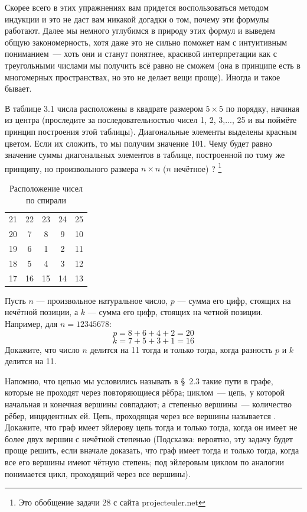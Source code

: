 Скорее всего в этих упражнениях вам придется воспользоваться методом индукции и это не даст вам никакой догадки о том, почему эти формулы работают. Далее мы немного углубимся в природу этих формул и выведем общую закономерность, хотя даже это не сильно поможет нам с интуитивным пониманием~— хоть они и станут понятнее, красивой интерпретации как с треугольными числами мы получить всё равно не сможем (она в принципе есть в многомерных пространствах, но это не делает вещи проще). Иногда и такое бывает.

\begin{exercise}
В таблице 3.1 числа расположены в квадрате размером $5\times 5$ по порядку, начиная из центра (проследите за последовательностью чисел 1, 2, 3,..., 25 и вы поймёте принцип построения этой таблицы). Диагональные элементы выделены красным цветом. Если их сложить, то мы получим значение 101. Чему будет равно значение суммы диагональных элементов в таблице, построенной по тому же принципу, но произвольного размера $n\times n$ ($n$ нечётное) ?
\footnote{Это обобщение задачи 28 с сайта projecteuler.net}
\end{exercise}

\begin{table}[h]
\centering
\begin{tabular}{ccccc}
{\color{red} 21} &22& 23& 24& {\color{red} 25}\\
20 & {\color{red} 7} & 8 & {\color{red} 9}& 10\\
19 & 6&  {\color{red} 1}&  2& 11\\
18 & {\color{red} 5} & 4 & {\color{red} 3}& 12\\
{\color{red} 17}& 16& 15& 14& {\color{red} 13}
\end{tabular}
\caption{Расположение чисел по спирали}
\end{table}

\begin{exercise}
Пусть $n$ — произвольное натуральное число, $p$ — сумма его цифр, стоящих на нечётной позиции, а $k$ — сумма его цифр, стоящих на четной позиции. Например, для $n=12345678$:
$$p=8+6+4+2 = 20$$
$$k=7+5+3+1 = 16$$
Докажите, что число $n$ делится на 11 тогда и только тогда, когда разность $p$ и $k$ делится на 11.
\end{exercise}

\begin{exercise}
Напомню, что цепью мы условились называть в \S~2.3 такие пути в графе, которые не проходят через повторяющиеся рёбра; циклом~— цепь, у которой начальная и конечная вершины совпадают; а степенью вершины~— количество рёбер, инцидентных ей. Цепь, проходящая через все вершины называется . Докажите, что граф имеет эйлерову цепь тогда и только тогда, когда он имеет не более двух вершин с нечётной степенью (Подсказка: вероятно, эту задачу будет проще решить, если вначале доказать, что граф имеет  тогда и только тогда, когда все его вершины имеют чётную степень; под эйлеровым циклом по аналогии понимается цикл, проходящий через все вершины).
\end{exercise}

